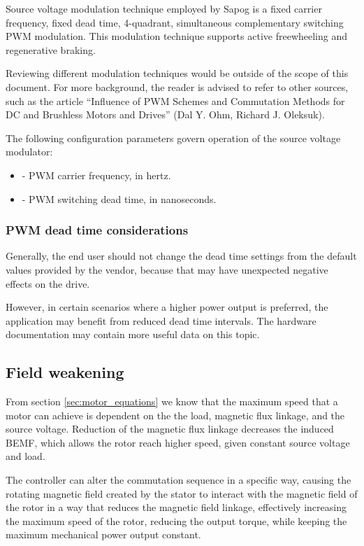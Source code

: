 \documentclass{zubaxdoc}
\begin{document}
Source voltage modulation technique employed by Sapog is a fixed carrier frequency, fixed dead time,
4-quadrant, simultaneous complementary switching PWM modulation.
This modulation technique supports active freewheeling and regenerative braking.

Reviewing different modulation techniques would be outside of the scope of this document.
For more background, the reader is advised to refer to other sources, such as the article
``Influence of PWM Schemes and Commutation Methods for DC and Brushless Motors and Drives''
(Dal Y. Ohm, Richard J. Oleksuk).

The following configuration parameters govern operation of the source voltage modulator:
\begin{itemize}
\item {} - PWM carrier frequency, in hertz.
\item {} - PWM switching dead time, in nanoseconds.
\end{itemize}

\subsubsection{PWM dead time considerations}

Generally, the end user should not change the dead time settings from the default values provided by
the vendor, because that may have unexpected negative effects on the drive.

However, in certain scenarios where a higher power output is preferred, the application may benefit from
reduced dead time intervals.
The hardware documentation may contain more useful data on this topic.

\subsection{Field weakening}\label{sec:field_weakening}

From section \ref{sec:motor_equations} we know that the maximum speed that a motor can achieve is dependent
on the the load, magnetic flux linkage, and the source voltage.
Reduction of the magnetic flux linkage decreases the induced BEMF, which allows the rotor reach higher speed,
given constant source voltage and load.

The controller can alter the commutation sequence in a specific way, causing the rotating magnetic field
created by the stator to interact with the magnetic field of the rotor in a way that reduces the magnetic
field linkage, effectively increasing the maximum speed of the rotor, reducing the output torque,
while keeping the maximum mechanical power output constant.
\end{document}
